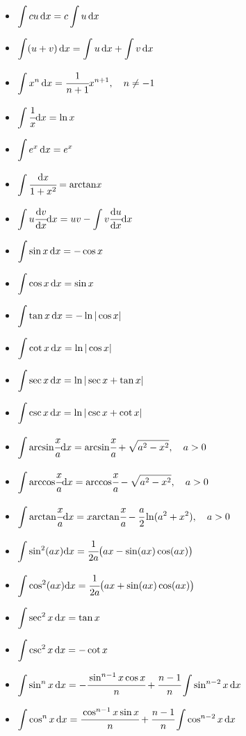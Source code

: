 \begin{itemize}
\item $ \displaystyle \int c u \,{ { \text{d} } x} = c \int u \,{ { \text{d} } x}$
\item $ \displaystyle \int (u + v) \,{ { \text{d} } x} = \int u \,{ { \text{d} } x} + \int v \,{ { \text{d} } x}$
\item $ \displaystyle \int x^n \,{ { \text{d} } x} = \cfrac{1}{n + 1}x^{n+1}, \quad n \neq -1$
\item $ \displaystyle \int \cfrac{1}{x}{ { \text{d} } x} = \ln x$
\item $ \displaystyle \int e^x \,{ { \text{d} } x} = e^x$
\item $ \displaystyle \int \cfrac{{ { \text{d} } x}}{1 + x ^ 2} = { \mathop{\text{arctan}} } x$
\item $ \displaystyle \int u \cfrac{{ { \text{d} } v }}{{ { \text{d} } x}} { { \text{d} } x} = uv - \int v \cfrac{{ { \text{d} } u }}{{ { \text{d} } x}} { { \text{d} } x}$
\item $ \displaystyle \int \sin x \,{ { \text{d} } x} = -\cos x$
\item $ \displaystyle \int \cos x \,{ { \text{d} } x} = \sin x$
\item $ \displaystyle \int \tan x \,{ { \text{d} } x} = -\ln \vert \cos x \vert$
\item $ \displaystyle \int \cot x \,{ { \text{d} } x} = \ln \vert \cos x \vert$
\item $ \displaystyle \int \sec x \,{ { \text{d} } x} = \ln \vert \sec x + \tan x \vert$
\item $ \displaystyle \int \csc x \,{ { \text{d} } x} = \ln \vert \csc x + \cot x \vert$
\item $ \displaystyle \int { \mathop{\text{arcsin}} } \cfrac{x}{a} { { \text{d} } x} = { \mathop{\text{arcsin}} } \cfrac{x}{a} + \sqrt{a^2 - x^2}, \quad \hbox{$a > 0$}$
\item $ \displaystyle \int { \mathop{\text{arccos}} } \cfrac{x}{a} { { \text{d} } x} = { \mathop{\text{arccos}} } \cfrac{x}{a} - \sqrt{a^2 - x^2}, \quad \hbox{$a > 0$}$
\item $ \displaystyle \int { \mathop{\text{arctan}} } \cfrac{x}{a} { { \text{d} } x} = x { \mathop{\text{arctan}} } \cfrac{x}{a} - \cfrac{a}{2} \ln(a^2 + x^2), \quad \hbox{$a > 0$}$
\item $ \displaystyle \int \sin^2 (a x) { { \text{d} } x} = \cfrac{1}{2a} \big(ax - \sin(ax) \cos(ax)\big)$
\item $ \displaystyle \int \cos^2 (a x) { { \text{d} } x} = \cfrac{1}{2a} \big(ax + \sin(ax) \cos(ax)\big)$
\item $ \displaystyle \int \sec^2 x \, { { \text{d} } x} = \tan x$
\item $ \displaystyle \int \csc^2 x \, { { \text{d} } x} = - \cot x$
\item $ \displaystyle \int \sin^n x \, { { \text{d} } x} = -\cfrac{\sin^{n-1} x \cos x}{n} + \cfrac{n-1}{n}\int \sin^{n-2} x \, { { \text{d} } x}$
\item $ \displaystyle \int \cos^n x \, { { \text{d} } x} = \cfrac{\cos^{n-1} x \sin x}{n} + \cfrac{n-1}{n}\int \cos^{n-2} x \, { { \text{d} } x}$

\end{itemize}
